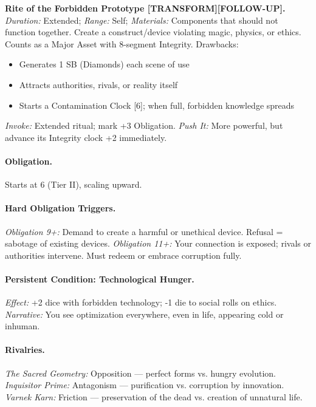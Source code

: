 \textbf{Rite of the Forbidden Prototype [TRANSFORM][FOLLOW-UP].}  
\emph{Duration:} Extended; \emph{Range:} Self; \emph{Materials:} Components that should not function together.  
Create a construct/device violating magic, physics, or ethics. Counts as a Major Asset with 8-segment Integrity. Drawbacks:  
\begin{itemize}
  \item Generates 1 SB (Diamonds) each scene of use  
  \item Attracts authorities, rivals, or reality itself  
  \item Starts a Contamination Clock [6]; when full, forbidden knowledge spreads  
\end{itemize}
\emph{Invoke:} Extended ritual; mark +3 Obligation.  
\emph{Push It:} More powerful, but advance its Integrity clock +2 immediately.

\paragraph{Obligation.} Starts at 6 (Tier II), scaling upward.

\paragraph{Hard Obligation Triggers.}  
\emph{Obligation 9+:} Demand to create a harmful or unethical device. Refusal = sabotage of existing devices.  
\emph{Obligation 11+:} Your connection is exposed; rivals or authorities intervene. Must redeem or embrace corruption fully.

\paragraph{Persistent Condition: Technological Hunger.}  
\emph{Effect:} +2 dice with forbidden technology; -1 die to social rolls on ethics.  
\emph{Narrative:} You see optimization everywhere, even in life, appearing cold or inhuman.

\paragraph{Rivalries.}  
\emph{The Sacred Geometry:} Opposition --- perfect forms vs. hungry evolution.  
\emph{Inquisitor Prime:} Antagonism --- purification vs. corruption by innovation.  
\emph{Varnek Karn:} Friction --- preservation of the dead vs. creation of unnatural life.

